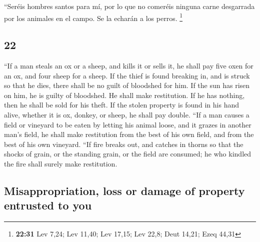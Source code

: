 \begin{paracol}{2}
 ``Seréis hombres santos para mí, por lo que no comeréis
ninguna carne desgarrada por los animales en el campo. Se la echarán a
los perros. \footnote{\textbf{22:31} Lev 7,24; Lev 11,40; Lev 17,15; Lev
  22,8; Deut 14,21; Ezeq 44,31}

\switchcolumn
\begin{otherlanguage}{english}

\hypertarget{section-43}{%
\section{22}\label{section-43}}

 ``If a man steals an ox or a sheep, and kills it or sells
it, he shall pay five oxen for an ox, and four sheep for a sheep.
 If the thief is found breaking in, and is struck so that
he dies, there shall be no guilt of bloodshed for him.  If
the sun has risen on him, he is guilty of bloodshed. He shall make
restitution. If he has nothing, then he shall be sold for his theft.
 If the stolen property is found in his hand alive,
whether it is ox, donkey, or sheep, he shall pay double. 
``If a man causes a field or vineyard to be eaten by letting his animal
loose, and it grazes in another man's field, he shall make restitution
from the best of his own field, and from the best of his own vineyard.
 ``If fire breaks out, and catches in thorns so that the
shocks of grain, or the standing grain, or the field are consumed; he
who kindled the fire shall surely make restitution.

\hypertarget{misappropriation-loss-or-damage-of-property-entrusted-to-you}{%
\subsection{Misappropriation, loss or damage of property entrusted to
you}\label{misappropriation-loss-or-damage-of-property-entrusted-to-you}}


\end{otherlanguage}
\end{paracol}
